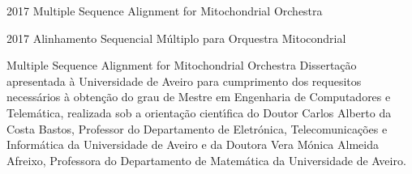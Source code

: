 \documentclass[11pt,twoside,a4paper]{report}
\def\ThesisYear{2017}
\begin{document}
%
%

\TitlePage
         {\ThesisYear}
        {Multiple Sequence Alignment for Mitochondrial Orchestra}
\EndTitlePage
\titlepage\ \endtitlepage %

\TitlePage
         {\ThesisYear}
        {Alinhamento  Sequencial M\'ultiplo para Orquestra Mitocondrial}
\EndTitlePage
\titlepage\ \endtitlepage %


%
%

\TitlePage
  \HEADER{}{\ThesisYear}
        {Multiple Sequence Alignment for Mitochondrial Orchestra}
  \vspace*{15mm}
  \TEXT{}
       {Disserta\c c\~ao apresentada \`a Universidade de Aveiro para cumprimento dos requesitos
        necess\'arios \`a obten\c c\~ao do grau de Mestre em Engenharia de Computadores e Telem\'atica, realizada sob a orienta\c c\~ao
        cient\'\i fica do Doutor Carlos Alberto da Costa Bastos, Professor do Departamento de Eletr\'onica, Telecomunica\c c\~oes e Inform\'atica da Universidade de Aveiro e da Doutora Vera M\'onica Almeida Afreixo, Professora do Departamento de Matem\'atica da Universidade de 	Aveiro.}
\EndTitlePage
\titlepage\ \endtitlepage %
\end{document}

